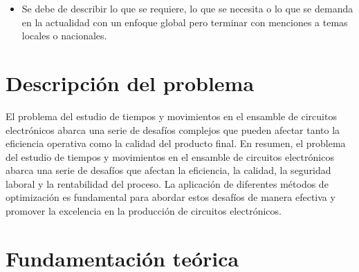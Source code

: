 
    \begin{itemize}
       \item Se debe de describir lo que se requiere, lo que se necesita o lo que se demanda en la actualidad con un enfoque global pero terminar con menciones a temas locales o nacionales.
    \end{itemize}
    \section{Descripción del problema}
    El problema del estudio de tiempos y movimientos en el ensamble de circuitos electrónicos abarca una serie de desafíos complejos que pueden afectar tanto la eficiencia operativa como la calidad del producto final.
    En resumen, el problema del estudio de tiempos y movimientos en el ensamble de circuitos electrónicos abarca una serie de desafíos que afectan la eficiencia, la calidad, la seguridad laboral y la rentabilidad del proceso. La aplicación de diferentes métodos de optimización es fundamental para abordar estos desafíos de manera efectiva y promover la excelencia en la producción de circuitos electrónicos.

    \section{Fundamentación teórica}

